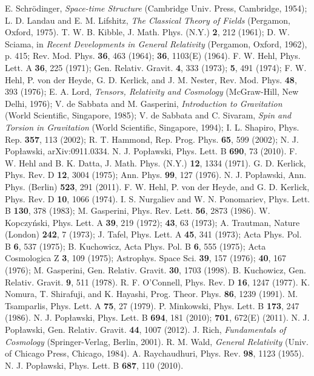 \documentclass[prd,onecolumn,nofootinbib,showpacs]{revtex4}
\begin{document}
\begin{thebibliography}{}
 E. Schr\"{o}dinger, {\it Space-time Structure} (Cambridge Univ. Press, Cambridge, 1954); L. D. Landau and E. M. Lifshitz, {\it The Classical Theory of Fields} (Pergamon, Oxford, 1975).
 T. W. B. Kibble, J. Math. Phys. (N.Y.) {\bf 2}, 212 (1961); D. W. Sciama, in {\em Recent Developments in General Relativity} (Pergamon, Oxford, 1962), p. 415; Rev. Mod. Phys. {\bf 36}, 463 (1964); {\bf 36}, 1103(E) (1964).
 F. W. Hehl, Phys. Lett. A {\bf 36}, 225 (1971); Gen. Relativ. Gravit. {\bf 4}, 333 (1973); {\bf 5}, 491 (1974); F. W. Hehl, P. von der Heyde, G. D. Kerlick, and J. M. Nester, Rev. Mod. Phys. {\bf 48}, 393 (1976); E. A. Lord, {\em Tensors, Relativity and Cosmology} (McGraw-Hill, New Delhi, 1976); V. de Sabbata and M. Gasperini, {\em Introduction to Gravitation} (World Scientific, Singapore, 1985); V. de Sabbata and C. Sivaram, {\em Spin and Torsion in Gravitation} (World Scientific, Singapore, 1994); I. L. Shapiro, Phys. Rep. {\bf 357}, 113 (2002); R. T. Hammond, Rep. Prog. Phys. {\bf 65}, 599 (2002); N. J. Pop{\l}awski, arXiv:0911.0334.
 N. J. Pop{\l}awski, Phys. Lett. B {\bf 690}, 73 (2010).
 F. W. Hehl and B. K. Datta, J. Math. Phys. (N.Y.) {\bf 12}, 1334 (1971).
 G. D. Kerlick, Phys. Rev. D {\bf 12}, 3004 (1975); Ann. Phys. {\bf 99}, 127 (1976).
 N. J. Pop{\l}awski, Ann. Phys. (Berlin) {\bf 523}, 291 (2011).
 F. W. Hehl, P. von der Heyde, and G. D. Kerlick, Phys. Rev. D {\bf 10}, 1066 (1974).
 I. S. Nurgaliev and W. N. Ponomariev, Phys. Lett. B {\bf 130}, 378 (1983); M. Gasperini, Phys. Rev. Lett. {\bf 56}, 2873 (1986).
 W. Kopczy\'{n}ski, Phys. Lett. A {\bf 39}, 219 (1972); {\bf 43}, 63 (1973); A. Trautman, Nature (London) {\bf 242}, 7 (1973); J. Tafel, Phys. Lett. A {\bf 45}, 341 (1973); Acta Phys. Pol. B {\bf 6}, 537 (1975); B. Kuchowicz, Acta Phys. Pol. B {\bf 6}, 555 (1975); Acta Cosmologica Z {\bf 3}, 109 (1975); Astrophys. Space Sci. {\bf 39}, 157 (1976); {\bf 40}, 167 (1976); M. Gasperini, Gen. Relativ. Gravit. {\bf 30}, 1703 (1998).
 B. Kuchowicz, Gen. Relativ. Gravit. {\bf 9}, 511 (1978).
 R. F. O'Connell, Phys. Rev. D {\bf 16}, 1247 (1977).
 K. Nomura, T. Shirafuji, and K. Hayashi, Prog. Theor. Phys. {\bf 86}, 1239 (1991).
 M. Tsamparlis, Phys. Lett. A {\bf 75}, 27 (1979).
 P. Minkowski, Phys. Lett. B {\bf 173}, 247 (1986).
 N. J. Pop{\l}awski, Phys. Lett. B {\bf 694}, 181 (2010); {\bf 701}, 672(E) (2011).
 N. J. Pop{\l}awski, Gen. Relativ. Gravit. {\bf 44}, 1007 (2012).
 J. Rich, {\it Fundamentals of Cosmology} (Springer-Verlag, Berlin, 2001).
 R. M. Wald, {\it General Relativity} (Univ. of Chicago Press, Chicago, 1984).
 A. Raychaudhuri, Phys. Rev. {\bf 98}, 1123 (1955).
 N. J. Pop{\l}awski, Phys. Lett. B {\bf 687}, 110 (2010).
\end{thebibliography}
\end{document}
